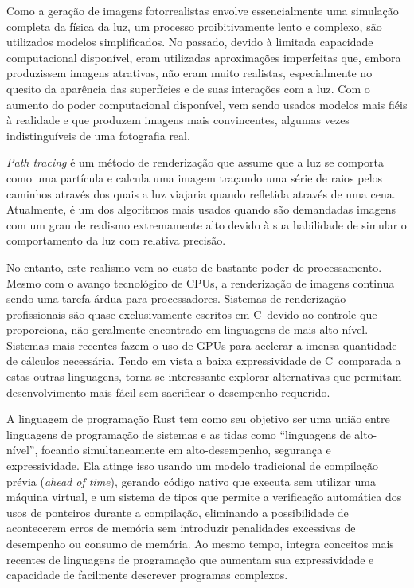 \documentclass[tg]{mdtufsm}
\def\Cpp{{C\nolinebreak[4]\raisebox{.20ex}{\small\bf++}}}
\begin{document}
Como a geração de imagens fotorrealistas envolve essencialmente uma simulação completa da física da
luz, um processo proibitivamente lento e complexo, são utilizados modelos simplificados. No
passado, devido à limitada capacidade computacional disponível, eram utilizadas aproximações
imperfeitas que, embora produzissem imagens atrativas, não eram muito realistas, especialmente no
quesito da aparência das superfícies e de suas interações com a luz. Com o aumento do poder
computacional disponível, vem sendo usados modelos mais fiéis à realidade e que produzem imagens
mais convincentes, algumas vezes indistinguíveis de uma fotografia real.

\emph{Path tracing} é um método de renderização que assume que a luz se comporta como uma partícula
e calcula uma imagem traçando uma série de raios pelos caminhos através dos quais a luz viajaria quando
refletida através de uma cena. Atualmente, é um dos algoritmos mais usados quando são demandadas
imagens com um grau de realismo extremamente alto devido à sua habilidade de simular o
comportamento da luz com relativa precisão. \citep{pharr2010}

No entanto, este realismo vem ao custo de bastante poder de processamento. Mesmo com o avanço
tecnológico de CPUs, a renderização de imagens continua sendo uma tarefa árdua para processadores.
Sistemas de renderização profissionais são quase exclusivamente escritos em \Cpp\ devido ao controle
que proporciona, não geralmente encontrado em linguagens de mais alto nível. Sistemas mais
recentes fazem o uso de GPUs para acelerar a imensa quantidade de cálculos necessária.
Tendo em vista a baixa expressividade de \Cpp\ comparada a estas outras linguagens, torna-se
interessante explorar alternativas que permitam desenvolvimento mais fácil sem sacrificar o
desempenho requerido.

A linguagem de programação Rust \citep{rust} tem como
seu objetivo ser uma união entre linguagens de programação de sistemas e as tidas como ``linguagens
de alto-nível'', focando simultaneamente em alto-desempenho, segurança e expressividade. Ela atinge
isso usando um modelo tradicional de compilação prévia (\emph{ahead of time}), gerando código nativo que executa
sem utilizar uma máquina virtual, e um sistema de tipos
que permite a verificação automática dos usos de ponteiros durante a compilação, eliminando a
possibilidade de acontecerem erros de memória sem introduzir penalidades excessivas de desempenho
ou consumo de memória. Ao mesmo tempo, integra conceitos mais recentes de linguagens de programação
que aumentam sua expressividade e capacidade de facilmente descrever programas complexos.
\end{document}
